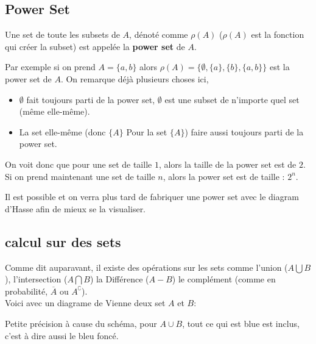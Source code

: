 \subsection{Power Set}
\begin{definition}
    Une set de toute les subsets de $A$, dénoté comme $\rho(A)$ ($\rho(A)$ est la fonction qui créer la subset) est appelée la \textbf{power set} de $A$.
\end{definition}
\hspace{0.4cm}
Par exemple si on prend $A = \{ a, b\}$ alors $\rho(A) = \{\emptyset, \{a\}, \{b\}, \{a, b\}\}$ est la power set de $A$. On remarque déjà plusieurs choses ici, 
\begin{itemize}
    \item $\emptyset$ fait toujours parti de la power set, $\emptyset$ est une subset de n'importe quel set (même elle-même).
    \item La set elle-même (donc $\{A\}$ Pour la set $\{A\}$) faire aussi toujours parti de la power set.
\end{itemize}
On voit donc que pour une set de taille $1$, alors la taille de la power set est de $2$. Si on prend maintenant une set de taille $n$, alors la power set est de taille : $2^n$.
\begin{framedremark}
    Il est possible et on verra plus tard de fabriquer une power set avec le diagram d'Hasse afin de mieux se la visualiser.
\end{framedremark}

\subsection{calcul sur des sets}
Comme dit auparavant, il existe des opérations sur les sets comme l'union ($A \bigcup B$), l'intersection ($A \bigcap B$) la Différence ($A - B$) le complément (comme en probabilité, $\overline{A}$ ou $A^\complement$).
\\
Voici avec un diagrame de Vienne deux set $A$ et $B$:
\begin{center}
    

\end{center}
\begin{framedremark}
    Petite précision à cause du schéma, pour $A \cup B$, tout ce qui est blue est inclus, c'est à dire aussi le bleu foncé.
\end{framedremark}

